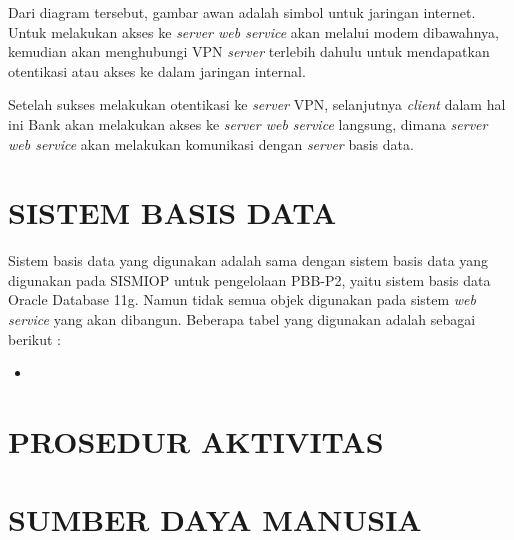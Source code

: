 \documentclass[pdftex,12pt, oneside]{article}
\begin{document}
Dari diagram tersebut, gambar awan adalah simbol untuk jaringan internet. Untuk melakukan akses ke \textit{server web service} akan melalui modem dibawahnya, kemudian akan menghubungi VPN \textit{server} terlebih dahulu untuk mendapatkan otentikasi atau akses ke dalam jaringan internal.

Setelah sukses melakukan otentikasi ke \textit{server} VPN, selanjutnya \textit{client} dalam hal ini Bank akan melakukan akses ke \textit{server web service} langsung, dimana \textit{server web service} akan melakukan komunikasi dengan \textit{server} basis data.

\section{SISTEM BASIS DATA}

Sistem basis data yang digunakan adalah sama dengan sistem basis data yang digunakan pada SISMIOP untuk pengelolaan PBB-P2, yaitu sistem basis data Oracle Database 11g. Namun tidak semua objek digunakan pada sistem \textit{web service} yang akan dibangun. Beberapa tabel yang digunakan adalah sebagai berikut :

\begin{itemize}
  \item 
\end{itemize}

\section{PROSEDUR AKTIVITAS}


\section{SUMBER DAYA MANUSIA}
\end{document}
